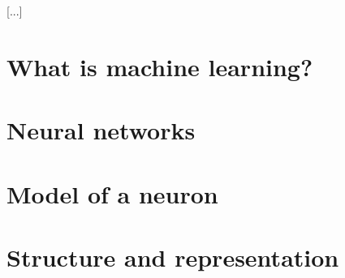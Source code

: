 [...]

\section{What is machine learning?}


\section{Neural networks}


\section{Model of a neuron}


\section{Structure and representation}


